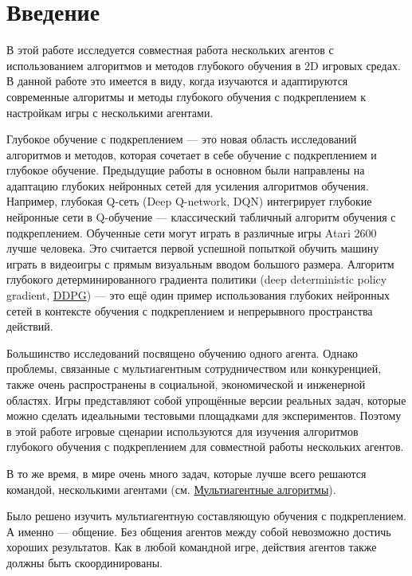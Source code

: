 \chapter*{Введение} \label{intro}%

В этой работе исследуется совместная работа нескольких агентов с использованием алгоритмов и методов глубокого обучения в 2D игровых средах. В данной работе это имеется в виду, когда изучаются и адаптируются современные алгоритмы и методы глубокого обучения с подкреплением к настройкам игры с несколькими агентами.

Глубокое обучение с подкреплением --- это новая область исследований алгоритмов и методов, которая сочетает в себе обучение с подкреплением и глубокое обучение. Предыдущие работы в основном были направлены на адаптацию глубоких нейронных сетей для усиления алгоритмов обучения. Например, глубокая Q-сеть (Deep Q-network, DQN) \cite{Mnih2015} интегрирует глубокие нейронные сети в Q-обучение --- классический табличный алгоритм обучения с подкреплением. Обученные сети могут играть в различные игры Atari 2600 \cite{Bellemare_2013} лучше человека. Это считается первой успешной попыткой обучить машину играть в видеоигры с прямым визуальным вводом большого размера. Алгоритм глубокого детерминированного градиента политики (deep deterministic policy gradient, \hyperref[acr:ddpg]{DDPG}) \cite{lillicrap2015continuous} --- это ещё один пример использования глубоких нейронных сетей в контексте обучения с подкреплением и непрерывного пространства действий.

Большинство исследований посвящено обучению одного агента. Однако проблемы, связанные с мультиагентным сотрудничеством или конкуренцией, также очень распространены в социальной, экономической и инженерной областях. Игры представляют собой упрощённые версии реальных задач, которые можно сделать идеальными тестовыми площадками для экспериментов. Поэтому в этой работе игровые сценарии используются для изучения алгоритмов глубокого обучения с подкреплением для совместной работы нескольких агентов.

В то же время, в мире очень много задач, которые лучше всего решаются командой, несколькими агентами (см. \hyperref[ch2:ma-algs]{Мультиагентные алгоритмы}).

Было решено изучить мультиагентную составляющую обучения с подкреплением. А именно --- общение. Без общения агентов между собой невозможно достичь хороших результатов. Как в любой командной игре, действия агентов также должны быть скоординированы.

